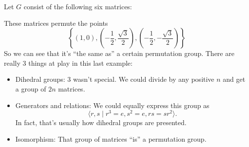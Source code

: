 \begin{example}
    Let $G$ consist of the following six matrices:
\end{example}

These matrices permute the points
\[
    \left\{ (1,0), 
    ( -\frac{1}{2},\frac{\sqrt{3}}{2} ), 
    ( -\frac{1}{2},-\frac{\sqrt{3}}{2} ) \right\}
\]
So we can see that it's ``the same as'' a certain permutation group.
There are really 3 things at play in this last example:
\begin{itemize}
    \item Dihedral groups: 3 wasn't special. 
    We could divide by any positive $n$ and get a group of $2n$ matrices.
    \item Generators and relations: We could equally express this group as
    \[ \langle r,s \mid r^3=e, s^2=e, rs=sr^2 \rangle.\]
    In fact, that's usually how dihedral groups are presented.
    \item Isomorphism: That group of matrices ``is'' a permutation group.
\end{itemize}





